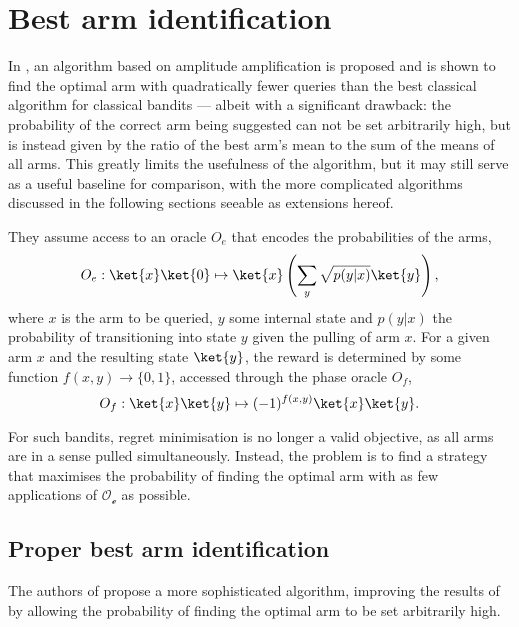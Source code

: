 \section{Best arm identification}
In \autocite{casale2020}, an algorithm based on amplitude amplification is proposed and is shown to find the optimal arm with quadratically fewer queries than the best classical algorithm for classical bandits — albeit with a significant drawback: the probability of the correct arm being suggested can not be set arbitrarily high, but is instead given by the ratio of the best arm's mean to the sum of the means of all arms.
This greatly limits the usefulness of the algorithm, but it may still serve as a useful baseline for comparison, with the more complicated algorithms discussed in the following sections seeable as extensions hereof.

They assume access to an oracle $O_e$ that encodes the probabilities of the arms,
\begin{equation}
    O_e: \ket{x}\ket{0} \mapsto \ket{x} \left(\sum_y \sqrt{p(y|x)} \ket{y}\right),
\end{equation}
where $x$ is the arm to be queried, $y$ some internal state and $p(y|x)$ the probability of transitioning into state $y$ given the pulling of arm $x$.
For a given arm $x$ and the resulting state $\ket{y}$, the reward is determined by some function $f(x,y) \to \{0, 1\}$, accessed through the phase oracle $O_f$,
\begin{equation}
    O_f :  \ket{x}\ket{y} \mapsto (-1)^{f(x,y)} \ket{x}\ket{y}.
\end{equation}

For such bandits, regret minimisation is no longer a valid objective, as all arms are in a sense pulled simultaneously.
Instead, the problem is to find a strategy that maximises the probability of finding the optimal arm with as few applications of $\mathcal{O_e}$ as possible.

\subsection{Proper best arm identification}
The authors of \autocite{wang2021} propose a more sophisticated algorithm, improving the results of \autocite{casale2020} by allowing the probability of finding the optimal arm to be set arbitrarily high.